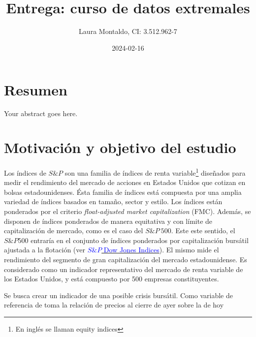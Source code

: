 \documentclass[
  12pt]{article}
\title{Entrega: curso de datos extremales}
\author{Laura Montaldo, CI: 3.512.962-7}
\date{2024-02-16}
\begin{document}
\maketitle

\newpage

\thispagestyle{empty}

\maketitle

\newpage

\tableofcontents

\newpage

\hypertarget{resumen}{%
\section{Resumen}\label{resumen}}

Your abstract goes here.

\newpage

\hypertarget{motivaciuxf3n-y-objetivo-del-estudio}{%
\section{Motivación y objetivo del
estudio}\label{motivaciuxf3n-y-objetivo-del-estudio}}

Los índices de \(S\&P\) son una familia de índices de renta
variable\footnote{En inglés se llaman equity indices} diseñados para
medir el rendimiento del mercado de acciones en Estados Unidos que
cotizan en bolsas estadounidenses. Ésta familia de índices está
compuesta por una amplia variedad de índices basados en tamaño, sector y
estilo. Los índices están ponderados por el criterio
\textit{float-adjusted market capitalization} (FMC). Además, se disponen
de índices ponderados de manera equitativa y con límite de
capitalización de mercado, como es el caso del \(S\&P\:500\). Este este
sentido, el \(S\&P 500\) entraría en el conjunto de índices ponderados
por capitalización bursátil ajustada a la flotación (ver
\href{http://www.overleaf.com}{\textcolor{blue}{$S\&P$ Dow Jones Indices}}).
El mismo mide el rendimiento del segmento de gran capitalización del
mercado estadounidense. Es considerado como un indicador representativo
del mercado de renta variable de los Estados Unidos, y está compuesto
por 500 empresas constituyentes.

Se busca crear un indicador de una posible crisis bursátil. Como
variable de referencia de toma la relación de precios al cierre de ayer
sobre la de hoy
\end{document}
